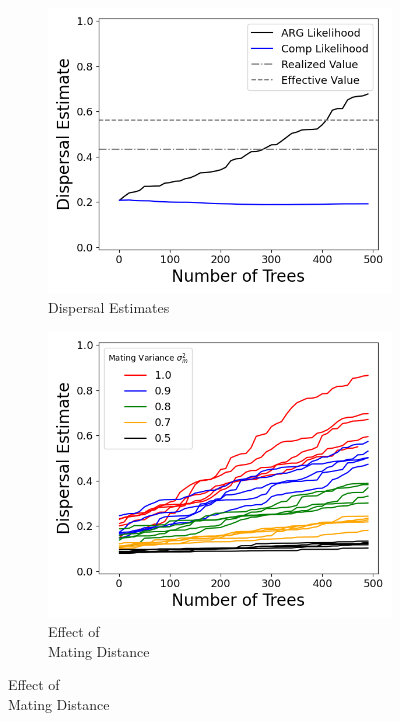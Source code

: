 \begin{figure}[H]
\begin{subfigure}{0.32\textwidth}
    \caption{Dispersal Estimates}
    \includegraphics[width=\linewidth]{Images/Figure5_DispersalRate/DispRateFinal.png}
\end{subfigure}
\begin{subfigure}{0.32\textwidth}
    \caption{Effect of \\ Mating Distance}
    \includegraphics[width=\linewidth]{Images/Figure5_DispersalRate/DispRateMating.png}
\end{subfigure}

\end{figure}
